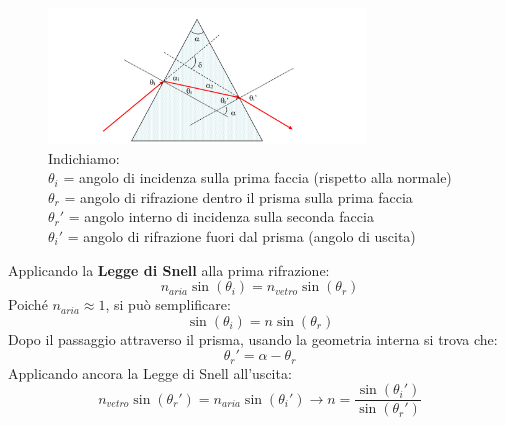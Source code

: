 \begin{figure}[H]
	\centering
	\includegraphics[width=0.75\textwidth]{./figures/prismateoria}
	\caption{Indichiamo: \\
		$\theta_i$ = angolo di incidenza sulla prima faccia (rispetto alla normale) \\
		$\theta_r$ = angolo di rifrazione dentro il prisma sulla prima faccia \\
		$\theta_r'$ = angolo interno di incidenza sulla seconda faccia \\
		$\theta_i'$ = angolo di rifrazione fuori dal prisma (angolo di uscita)}
\end{figure}

Applicando la \textbf{Legge di Snell} alla prima rifrazione:
\begin{equation}
	n_{aria}\sin(\theta_i)=n_{vetro}\sin(\theta_r)
\end{equation}
Poiché $n_{aria} \approx 1$, si può semplificare:
\begin{equation}
	\sin(\theta_i)=n\sin(\theta_r)
\end{equation}
Dopo il passaggio attraverso il prisma, usando la geometria interna si trova che:
\begin{equation}
	\theta_r'=\alpha-\theta_r
\end{equation}
Applicando ancora la Legge di Snell all'uscita:
\begin{equation}
	n_{vetro}\sin(\theta_r')=n_{aria}\sin(\theta_i') \rightarrow n=\frac{\sin(\theta_i')}{\sin(\theta_r')}
\end{equation}

